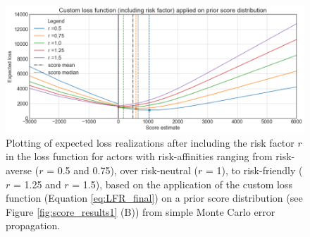 			\begin{figure}[h]
				\centering
				\includegraphics[width=1\textwidth]{Figures/LFR.png}
				\caption{Plotting of expected loss realizations after including the risk factor $r$ in the loss function  for actors with risk-affinities ranging from risk-averse ($r$ = 0.5 and 0.75), over risk-neutral ($r$ = 1), to risk-friendly ($r$ = 1.25 and $r$ = 1.5), based on the application of the custom loss function (Equation \ref{eq:LFR_final}) on a prior score distribution (see Figure \ref{fig:score_results1} (B)) from simple Monte Carlo error propagation.}\label{fig:1D_LFR} 
			\end{figure}			
